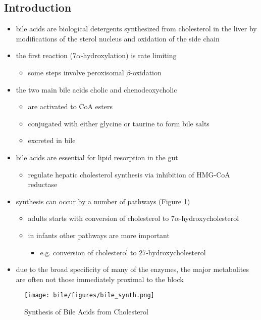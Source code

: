 \documentclass[12pt]{scrartcl}
\begin{document}
\subsection{Introduction}
\label{sec:org683574f}
\begin{itemize}
\item bile acids are biological detergents synthesized from cholesterol
in the liver by modifications of the sterol nucleus and oxidation of
the side chain
\item the first reaction (7\(\alpha\)-hydroxylation) is rate limiting
\begin{itemize}
\item some steps involve peroxisomal \(\beta\)-oxidation
\end{itemize}
\item the two main bile acids cholic and chenodeoxycholic
\begin{itemize}
\item are activated to CoA esters
\item conjugated with either glycine or taurine to form bile salts
\item excreted in bile
\end{itemize}
\item bile acids are essential for lipid resorption in the gut
\begin{itemize}
\item regulate hepatic cholesterol synthesis via inhibition of HMG-CoA reductase
\end{itemize}
\item synthesis can occur by a number of pathways (Figure \ref{fig:orgd4c0a98})
\begin{itemize}
\item adults starts with conversion of cholesterol to 7\(\alpha\)-hydroxycholesterol
\item in infants other pathways are more important
\begin{itemize}
\item e.g. conversion of cholesterol to 27-hydroxycholesterol
\end{itemize}
\end{itemize}
\item due to the broad specificity of many of the enzymes, the major
metabolites are often not those immediately proximal to the block
\end{itemize}

\begin{figure}[htbp]
\centering
\texttt{[image: bile/figures/bile\_synth.png]}
\caption{\label{fig:orgd4c0a98}Synthesis of Bile Acids from Cholesterol}
\end{figure}
\end{document}
